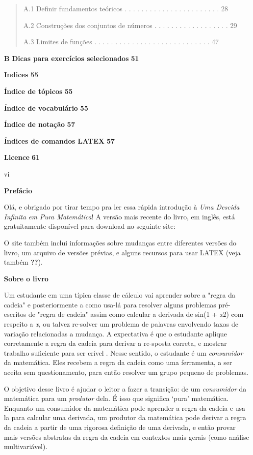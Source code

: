 \documentclass[
]{article}
\begin{document}
\begin{quote}
A.1 Definir fundamentos teóricos . . . . . . . . . . . . . . . . . . . .
. . . 28

A.2 Construções dos conjuntos de números . . . . . . . . . . . . . . . .
. . 29

A.3 Limites de funções . . . . . . . . . . . . . . . . . . . . . . . . .
. . . 47
\end{quote}

\textbf{B} \textbf{Dicas para exercícios selecionados} \textbf{51}

\textbf{Indices} \textbf{55}

\textbf{Índice de tópicos} \textbf{55}

\textbf{Índice de vocabulário} \textbf{55}

\textbf{Índice de notação} \textbf{57}

\textbf{Índices de comandos LATEX} \textbf{57}

\textbf{Licence} \textbf{61}

vi

\textbf{Prefácio}

Olá, e obrigado por tirar tempo pra ler essa rápida introdução à
\emph{Uma Descida Infinita em Pura Matemática}! A versão mais recente do
livro, em inglês, está gratuitamente disponível para download no
seguinte site:

O site também inclui informações sobre mudanças entre diferentes versões
do livro, um arquivo de versões prévias, e alguns recursos para usar
LATEX (veja também \textbf{??}).

\textbf{Sobre o livro}

Um estudante em uma típica classe de cálculo vai aprender sobre a "regra
da cadeia" e posteriormente a como usa-lá para resolver alguns problemas
pré-escritos de "regra de cadeia" assim como calcular a derivada de
sin(1 + \emph{x}2) com respeito a \emph{x}, ou talvez re-solver um
problema de palavras envolvendo taxas de variação relacionadas a
mudança. A expectativa é que o estudante aplique corretamente a regra da
cadeia para derivar a re-sposta correta, e mostrar trabalho suficiente
para ser crível . Nesse sentido, o estudante é um \emph{consumidor} da
matemática. Eles recebem a regra da cadeia como uma ferramenta, a ser
aceita sem questionamento, para então resolver um grupo pequeno de
problemas.

O objetivo desse livro é ajudar o leitor a fazer a transição: de um
\emph{consumidor} da matemática para um \emph{produtor} dela. É isso que
significa `pura' matemática. Enquanto um consumidor da matemática pode
aprender a regra da cadeia e usa-la para calcular uma derivada, um
produtor da matemática pode derivar a regra da cadeia a partir de uma
rigorosa definição de uma derivada, e então provar mais versões
abstratas da regra da cadeia em contextos mais gerais (como análise
multivariável).
\end{document}
